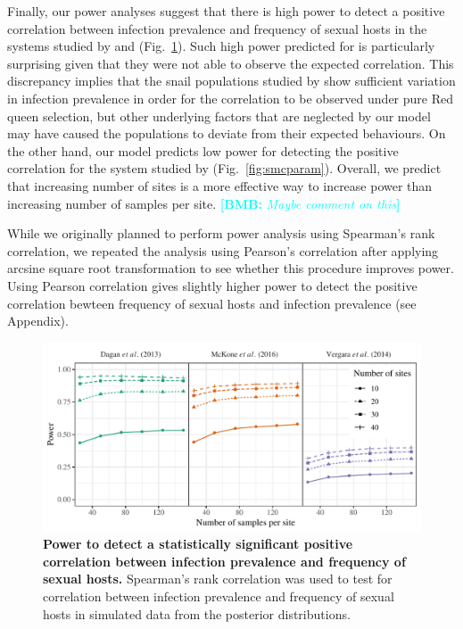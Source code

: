 \documentclass{article}\usepackage[]{graphicx}\usepackage[]{color}
\newcommand{\comment}[3]{\textcolor{#1}{\textbf{[#2: }\textit{#3}\textbf{]}}}
\newcommand{\bmb}[1]{\comment{cyan}{BMB}{#1}}
\newcommand{\fref}[1]{Fig.~\ref{fig:#1}}
\begin{document}
Finally, our power analyses suggest that there is high power to detect a positive correlation between infection prevalence and frequency of sexual hosts in the systems studied by \cite{dagan2013clonal} and \cite{mckone2016fine} (\fref{power}).
Such high power predicted for \cite{dagan2013clonal} is particularly surprising given that they were not able to observe the expected correlation.
This discrepancy implies that the snail populations studied by \cite{dagan2013clonal} show sufficient variation in infection prevalence in order for the correlation to be observed under pure Red queen selection, but other underlying factors that are neglected by our model may have caused the populations to deviate from their expected behaviours.
On the other hand, our model predicts low power for detecting the positive correlation for the system studied by \cite{vergara2014infection} (\fref{smcparam}).
Overall, we predict that increasing number of sites is a more effective way to increase power than increasing number of samples per site.
\bmb{Maybe comment on this}

While we originally planned to perform power analysis using Spearman's rank correlation,
we repeated the analysis using Pearson's correlation after applying arcsine square root transformation \citep{lively1992parthenogenesis} to see whether this procedure improves power.
Using Pearson correlation gives slightly higher power to detect the positive correlation bewteen frequency of sexual hosts and infection prevalence (see Appendix).

\begin{figure}[!ht]
\includegraphics[width=\textwidth]{../fig/power.pdf}
\caption{{\bf Power to detect a statistically significant positive correlation between infection prevalence and frequency of sexual hosts.}
Spearman's rank correlation was used to test for correlation between infection prevalence and frequency of sexual hosts in simulated data from the posterior distributions.
}
\label{fig:power}
\end{figure}
\end{document}
